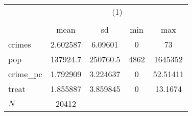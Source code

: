 {
\def\sym#1{\ifmmode^{#1}\else\(^{#1}\)\fi}
\begin{tabular}{l*{1}{cccc}}
\hline\hline
            &\multicolumn{4}{c}{(1)}                            \\
            &\multicolumn{4}{c}{}                               \\
            &        mean&          sd&         min&         max\\
\hline
crimes      &    2.602587&     6.09601&           0&          73\\
pop         &    137924.7&    250760.5&        4862&     1645352\\
crime\_pc    &    1.792909&    3.224637&           0&    52.51411\\
treat       &    1.855887&    3.859845&           0&     13.1674\\
\hline
\(N\)       &       20412&            &            &            \\
\hline\hline
\end{tabular}
}
